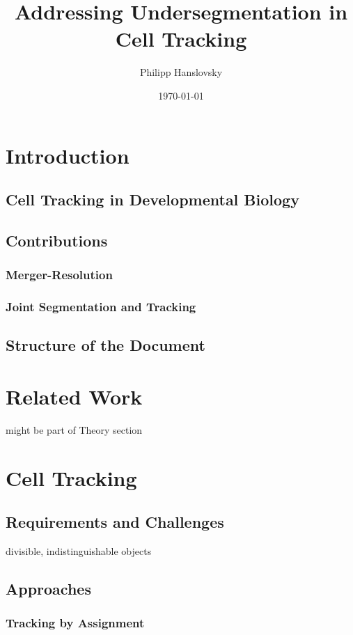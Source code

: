 \documentclass[11pt]{article}
\title{Addressing Undersegmentation in Cell Tracking}
\author{Philipp Hanslovsky}
\date{\today}
\begin{document}
\maketitle

\setcounter{tocdepth}{3}
\tableofcontents
\vspace*{1cm}

\section{Introduction}
\label{sec-1}
\subsection{Cell Tracking in Developmental Biology}
\label{sec-1-1}
\subsection{Contributions}
\label{sec-1-2}
\subsubsection{Merger-Resolution}
\label{sec-1-2-1}
\subsubsection{Joint Segmentation and Tracking}
\label{sec-1-2-2}
\subsection{Structure of the Document}
\label{sec-1-3}
\section{Related Work}
\label{sec-2}

  might be part of Theory section
\section{Cell Tracking}
\label{sec-3}
\subsection{Requirements and Challenges}
\label{sec-3-1}

   divisible, indistinguishable objects
\subsection{Approaches}
\label{sec-3-2}
\subsubsection{Tracking by Assignment}
\label{sec-3-2-1}
\end{document}

